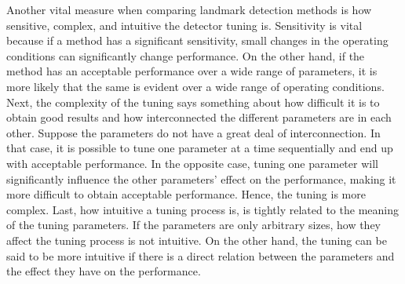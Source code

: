 Another vital measure when comparing landmark detection methods is how sensitive, complex, and intuitive the detector tuning is. Sensitivity is vital because if a method has a significant sensitivity, small changes in the operating conditions can significantly change performance. On the other hand, if the method has an acceptable performance over a wide range of parameters, it is more likely that the same is evident over a wide range of operating conditions. Next, the complexity of the tuning says something about how difficult it is to obtain good results and how interconnected the different parameters are in each other. Suppose the parameters do not have a great deal of interconnection. In that case, it is possible to tune one parameter at a time sequentially and end up with acceptable performance. In the opposite case, tuning one parameter will significantly influence the other parameters' effect on the performance, making it more difficult to obtain acceptable performance. Hence, the tuning is more complex. Last, how intuitive a tuning process is, is tightly related to the meaning of the tuning parameters. If the parameters are only arbitrary sizes, how they affect the tuning process is not intuitive. On the other hand, the tuning can be said to be more intuitive if there is a direct relation between the parameters and the effect they have on the performance.     
